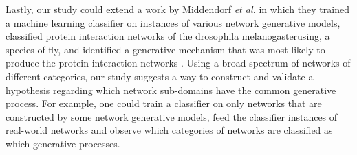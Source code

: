 \documentclass{article}
\begin{document}
Lastly, our study could extend a work by Middendorf \textit{et al.} in which they trained a machine learning classifier on instances of various network generative models, classified protein interaction networks of the drosophila melanogasterusing, a species of fly, and identified a generative mechanism that was most likely to produce the protein interaction networks \cite{MechanismInference}. Using a broad spectrum of networks of different categories, our study suggests a way to construct and validate a hypothesis regarding which network sub-domains have the common generative process. For example, one could train a classifier on only networks that are constructed by some network generative models, feed the classifier instances of real-world networks and observe which categories of networks are classified as which generative processes.

\clearpage


 
\end{document}
